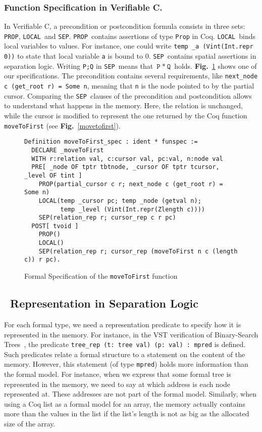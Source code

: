 \def\prop{\lstinline[language=Coq]{PROP}}
\def\local{\lstinline[language=Coq]{LOCAL}}
\def\sep{\lstinline[language=Coq]{SEP}}

\subsubsection{Function Specification in Verifiable C.}
In Verifiable C, a precondition or postcondition formula consists in three sets: \prop, \local\ and \sep.
\prop\ contains assertions of type \texttt{Prop} in Coq.
\local\ binds local variables to values. For instance, one could write \texttt{temp \_a (Vint(Int.repr 0))} to state that local variable \texttt{a} is bound to 0.
\sep\ contains spatial assertions in separation logic. Writing \texttt{P;Q} in \sep\ means that $\texttt{P}~*~\texttt{Q}$ holds.
\textbf{Fig.}~\ref{spec} shows one of our specifications.
The precondition contains several requirements, like \texttt{next\_node c (get\_root r) = Some n}, meaning that \texttt{n} is the node pointed to by the partial cursor.
Comparing the \sep\ clauses of the precondition and postcondition allows to understand what happens in the memory.
Here, the relation is unchanged, while the cursor is modified to represent the one returned by the Coq function \texttt{moveToFirst} (see \textbf{Fig.}~\ref{movetofirst}).

\begin{figure}
\begin{lstlisting}[language=Coq]
Definition moveToFirst_spec : ident * funspec :=
  DECLARE _moveToFirst
  WITH r:relation val, c:cursor val, pc:val, n:node val
  PRE[ _node OF tptr tbtnode, _cursor OF tptr tcursor, _level OF tint ]
    PROP(partial_cursor c r; next_node c (get_root r) = Some n)
    LOCAL(temp _cursor pc; temp _node (getval n);
          temp _level (Vint(Int.repr(Zlength c))))
    SEP(relation_rep r; cursor_rep c r pc)
  POST[ tvoid ]
    PROP()
    LOCAL()
    SEP(relation_rep r; cursor_rep (moveToFirst n c (length c)) r pc).
\end{lstlisting}
\caption{Formal Specification of the \texttt{moveToFirst} function}
\label{spec}
\end{figure}


\subsection{\btrees\ Representation in Separation Logic}
\label{subsec:rep}
For each formal type, we need a representation predicate to specify how it is represented in the memory.
For instance, in the VST verification of Binary-Search Trees~\cite{vst}, the predicate \lstinline[language=Coq]{tree_rep (t: tree val) (p: val) : mpred} is defined.
Such predicates relate a formal structure to a statement on the content of the memory.
However, this statement (of type \texttt{mpred}) holds more information than the formal model.
For instance, when we express that some formal tree is represented in the memory, we need to say at which address is each node represented at.
These addresses are not part of the formal model.
Similarly, when using a Coq list as a formal model for an array, the memory actually contains more than the values in the list if the list's length is not as big as the allocated size of the array.

